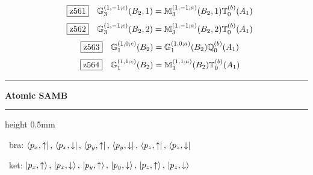 \documentclass[fleqn,10pt,landscape]{jsarticle}
\begin{document}
\begin{dmath*}
\hspace*{3mm}\fbox{z561}\quad \mathbb{G}_{3}^{(1,-1;c)}(B_{2},1)=\mathbb{M}_{3}^{(1,-1;a)}(B_{2},1) \mathbb{T}_{0}^{(b)}(A_{1})
\end{dmath*}
\begin{dmath*}
\hspace*{3mm}\fbox{z562}\quad \mathbb{G}_{3}^{(1,-1;c)}(B_{2},2)=\mathbb{M}_{3}^{(1,-1;a)}(B_{2},2) \mathbb{T}_{0}^{(b)}(A_{1})
\end{dmath*}
\begin{dmath*}
\hspace*{3mm}\fbox{z563}\quad \mathbb{G}_{1}^{(1,0;c)}(B_{2})=\mathbb{G}_{1}^{(1,0;a)}(B_{2}) \mathbb{Q}_{0}^{(b)}(A_{1})
\end{dmath*}
\begin{dmath*}
\hspace*{3mm}\fbox{z564}\quad \mathbb{G}_{1}^{(1,1;c)}(B_{2})=\mathbb{M}_{1}^{(1,1;a)}(B_{2}) \mathbb{T}_{0}^{(b)}(A_{1})
\end{dmath*}
\vspace{5mm}

\vspace{5mm}
\noindent \rule[0.5mm]{5mm}{0.5mm}\hspace{3mm}\textbf{Atomic SAMB}\hspace{3mm}\leaders\hrule height 0.5mm\hfill\kern0pt
\vspace{3mm}

\vspace{5mm}

\noindent\textbullet\, bra: $\bra{p_{x},\uparrow},\, \bra{p_{x},\downarrow},\, \bra{p_{y},\uparrow},\, \bra{p_{y},\downarrow},\, \bra{p_{z},\uparrow},\, \bra{p_{z},\downarrow}$

\noindent\textbullet\, ket: $\ket{p_{x},\uparrow},\, \ket{p_{x},\downarrow},\, \ket{p_{y},\uparrow},\, \ket{p_{y},\downarrow},\, \ket{p_{z},\uparrow},\, \ket{p_{z},\downarrow}$
\end{document}
